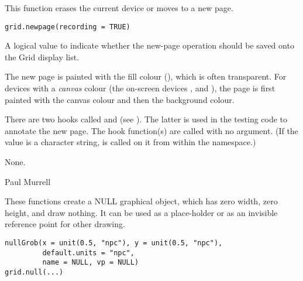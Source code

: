 %
\begin{Description}\relax
This function erases the current device or moves to a new page.
\end{Description}
%
\begin{Usage}
\begin{verbatim}
grid.newpage(recording = TRUE)
\end{verbatim}
\end{Usage}
%
\begin{Arguments}
\begin{ldescription}
\item[\code{recording}] A logical value to indicate whether the new-page
operation should be saved onto the Grid display list.
\end{ldescription}
\end{Arguments}
%
\begin{Details}\relax
The new page is painted with the fill colour
(), which is often transparent.  For devices
with a \emph{canvas} colour (the on-screen devices ,
 and ), the page is first painted with the
canvas colour and then the background colour.

There are two hooks called  and
 (see ).  The latter
is used in the testing code to annotate the new page.  The hook
function(s) are called with no argument.  (If the value is a character
string,  is called on it from within the 
namespace.)
\end{Details}
%
\begin{Value}
None.
\end{Value}
%
\begin{Author}\relax
Paul Murrell
\end{Author}
%
\begin{SeeAlso}\relax
{}
\end{SeeAlso}
%
\begin{Description}\relax
These functions create a NULL graphical object,
which has zero width, zero height, and draw nothing.
It can be used as a place-holder or as an invisible
reference point for other drawing.
\end{Description}
%
\begin{Usage}
\begin{verbatim}
nullGrob(x = unit(0.5, "npc"), y = unit(0.5, "npc"),
         default.units = "npc",
         name = NULL, vp = NULL)
grid.null(...)
\end{verbatim}
\end{Usage}
